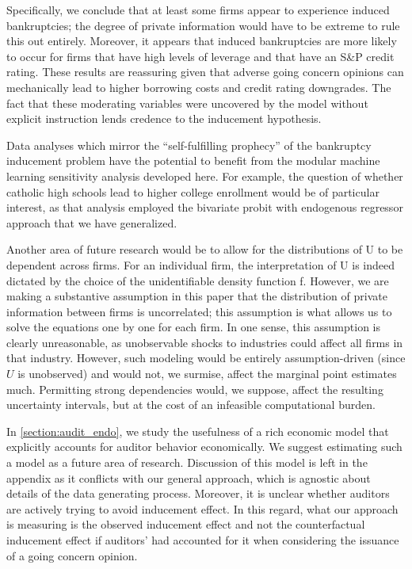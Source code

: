 \documentclass[aoas,preprint, 11pt, dvipsnames, table, x11name]{imsart}
\theoremstyle{remark}
\begin{document}
	Specifically, we conclude that at least some firms appear to experience induced bankruptcies; the degree of private information would have to be extreme to rule this out entirely. Moreover, it appears that induced bankruptcies are more likely to occur for firms that have high levels of leverage and that have an S\&P credit rating. These results are reassuring given that adverse going concern opinions can mechanically lead to higher borrowing costs and credit rating downgrades. The fact that these moderating variables were uncovered by the model without explicit instruction lends credence to the inducement hypothesis.
	

	
	Data analyses which mirror the ``self-fulfilling prophecy'' of the bankruptcy inducement problem have the potential to benefit from the modular machine learning sensitivity analysis developed here. For example, the question of whether catholic high schools lead to higher college enrollment \citep{Evans-Schwab-1995} would be of particular interest, as that analysis employed the bivariate probit with endogenous regressor approach that we have generalized.

	Another area of future research would be to allow for the distributions of U to be dependent across firms. For an individual firm, the interpretation of U is indeed dictated by the choice of the unidentifiable density function f. However, we are making a substantive assumption in this paper that the distribution of private information between firms is uncorrelated; this assumption is what allows us to solve the equations one by one for each firm.
	In one sense, this assumption is clearly unreasonable, as unobservable shocks to industries could affect all firms in that industry. However, such modeling would be entirely assumption-driven (since $U$ is unobserved) and would not, we surmise, affect the marginal point estimates much. Permitting strong dependencies would, we suppose, affect the resulting uncertainty intervals, but at the cost of an infeasible computational burden.
	
	
	In \autoref{section:audit_endo}, we study the usefulness of a rich economic model that explicitly accounts for auditor behavior economically.  We suggest estimating such a model as a future area of research.  Discussion of this model is left in the appendix as it conflicts with our general approach, which is agnostic about details of the data generating process. Moreover, it is unclear whether auditors are actively trying to avoid inducement effect. In this regard, what our approach is measuring is the observed inducement effect and not the counterfactual inducement effect if auditors’ had accounted for it when considering the issuance of a going concern opinion.
\end{document}
